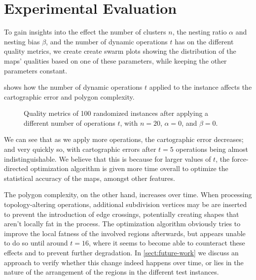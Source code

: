 



\section{Experimental Evaluation}
\label{sect:experimental-evaluation}

To gain insights into the effect the number of clusters $n$, the nesting ratio $\alpha$ and nesting bias $\beta$, and the number of dynamic operations $t$ has on the different quality metrics, we create create swarm plots showing the distribution of the maps' qualities based on one of these parameters, while keeping the other parameters constant.

 shows how the number of dynamic operations $t$ applied to the instance affects the cartographic error and polygon complexity.

\begin{figure}[H]
	\centering
	\quad
	\quad
	\caption{Quality metrics of 100 randomized instances after applying a different number of operations $t$, with $n = 20$, $\alpha = 0$, and $\beta = 0$.}
	\label{fig:experimental-evaluation-variable-number-of-operations}
\end{figure}

We can see that as we apply more operations, the cartographic error decreases; and very quickly so, with cartographic errors after $t = 5$ operations being almost indistinguishable.
We believe that this is because for larger values of $t$, the force-directed optimization algorithm is given more time overall to optimize the statistical accuracy of the maps, amongst other features.

The polygon complexity, on the other hand, increases over time.
When processing topology-altering operations, additional subdivision vertices may be are inserted to prevent the introduction of edge crossings, potentially creating shapes that aren't locally fat in the process.
The optimization algorithm obviously tries to improve the local fatness of the involved regions afterwards, but appears unable to do so until around $t = 16$, where it seems to become able to counteract these effects and to prevent further degradation.
In \cref{sect:future-work} we discuss an approach to verify whether this change indeed happens over time, or lies in the nature of the arrangement of the regions in the different test instances.

